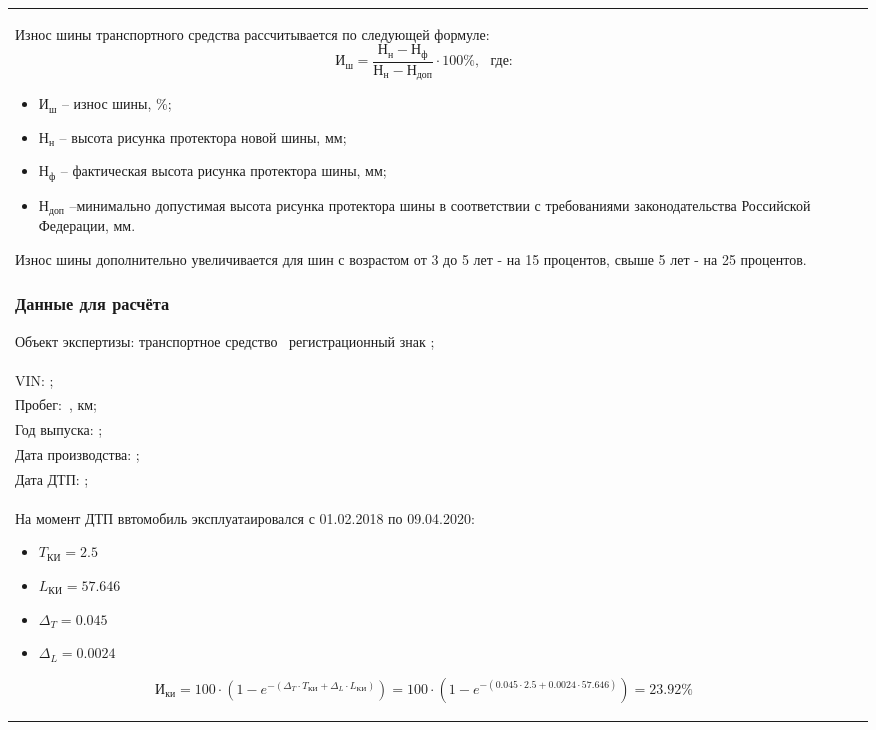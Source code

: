 \begin{longtable}{G{3mm}|M{90mm}|G{60mm}}
	Износ шины транспортного средства рассчитывается по следующей формуле:
	\begin{equation}\label{eq:sh}
		\text{И}_{\text{ш}} = \frac{\text{Н}_{\text{н}}-\text{Н}_{\text{ф}}}{\text{Н}_{\text{н}}-\text{Н}_{\text{доп}}} \cdot{100}\%,  \,\,\,\,\text{где:} 
	\end{equation}
	\begin{itemize}
		\item[ ] $ \text{И}_{\text{ш}} $ -- износ шины, \%;
		\item[ ] $ \text{Н}_{\text{н}} $ -- высота рисунка протектора новой шины, мм;
		\item[ ] $\text{Н}_{\text{ф}} $ -- фактическая высота рисунка протектора шины, мм;
		\item[ ] $ \text{Н}_{\text{доп}} $ --минимально допустимая высота рисунка протектора шины в соответствии с требованиями законодательства Российской Федерации, мм.
	\end{itemize}
	\vspace{5mm}
	\relax
	Износ шины дополнительно увеличивается для шин с возрастом от 3 до 5 лет - на 15 процентов, свыше 5 лет - на 25 процентов.
	
	
	\subsubsection{Данные для расчёта}
	
	\noindent Объект экспертизы:  транспортное средство \tc\,
	регистрационный знак ;\\ 
	VIN: ;\\
	Пробег:    \,, км;\\
	Год выпуска:     ;\\ 
	Дата  производства:  ;\\
	Дата ДТП:  ;\\
	
	На момент ДТП ввтомобиль эксплуатаировался с 01.02.2018 по 09.04.2020: 
	\begin{itemize}
		\item[ ]$ T_{\text{КИ}} = 2.5 $ 
		\item[ ]$ L_{\text{КИ}} = 57.646$
		\item[ ]$ \Delta_{T} = 0.045 $ 
		\item[ ]$ \Delta_{L} = 0.0024 $
	\end{itemize}
	\begin{equation}\label{eq:I}
		\text{И}_{\text{ки}} 
		= 100\cdot\left( 1-e^ {-\left( \Delta_{T} \cdot T_{\text{КИ}} + \Delta_{L} \cdot L_{\text{КИ}} \right)}\right) = 100\cdot\left( 1-e^ {-\left( 0.045 \cdot 2.5 + 0.0024 \cdot 57.646 \right)}\right) =  23.92 \%  
	\end{equation}
	

\end{longtable}
